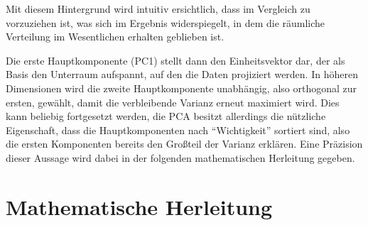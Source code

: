 Mit diesem Hintergrund wird intuitiv ersichtlich, dass  im Vergleich zu  vorzuziehen ist, was sich im Ergebnis widerspiegelt, in dem die räumliche Verteilung im Wesentlichen erhalten geblieben ist.

Die erste Hauptkomponente (PC1) stellt dann den Einheitsvektor dar, der als Basis den Unterraum aufspannt, auf den die Daten projiziert werden.
In höheren Dimensionen wird die zweite Hauptkomponente unabhängig, also orthogonal zur ersten, gewählt, damit die verbleibende Varianz  erneut maximiert wird.
Dies kann beliebig fortgesetzt werden, die PCA besitzt allerdings die nützliche Eigenschaft, dass die Hauptkomponenten nach \enquote{Wichtigkeit} sortiert sind, also die ersten Komponenten bereits den Großteil der Varianz erklären.
Eine Präzision dieser Aussage wird dabei in der folgenden mathematischen Herleitung gegeben.

\section{Mathematische Herleitung}

